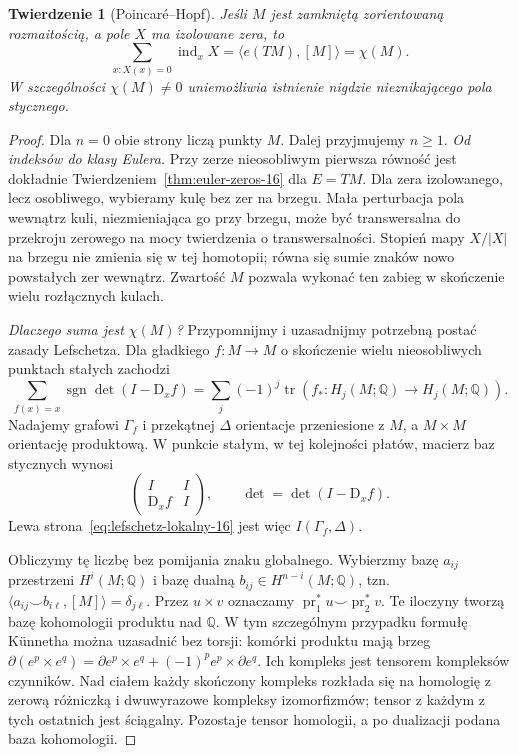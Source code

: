 \documentclass[11pt,a4paper,oneside]{report}
\newcommand{\Q}{\mathbb{Q}}
\newcommand{\pr}{\operatorname{pr}}
\newcommand{\D}{\mathrm D}
\theoremstyle{plain}
\newtheorem{twierdzenie}{Twierdzenie}[section]
\theoremstyle{definition}
\theoremstyle{remark}
\begin{document}
\begin{twierdzenie}[Poincaré--Hopf]
\label{thm:poincare-hopf-16}
Jeśli $M$ jest
zamkniętą
zorientowaną rozmaitością,
a pole $X$ ma
izolowane zera, to
\begin{equation}\label{eq:poincare-hopf-16}
 \sum_{x:X(x)=0}
     \operatorname{ind}_x X
 =\langle e(TM),[M]\rangle
 =\chi(M).
\end{equation}
W szczególności
$\chi(M)\ne0$
uniemożliwia istnienie
nigdzie nieznikającego
pola stycznego.
\end{twierdzenie}
\begin{proof}
Dla $n=0$ obie strony liczą punkty $M$.
Dalej przyjmujemy $n\geq1$.
\emph{Od indeksów do klasy Eulera.}
Przy zerze nieosobliwym
pierwsza równość jest
dokładnie
Twierdzeniem~\ref{thm:euler-zeros-16}
dla $E=TM$. Dla zera
izolowanego, lecz
osobliwego, wybieramy
kulę bez zer na
brzegu. Mała perturbacja
pola wewnątrz kuli,
niezmieniająca go
przy brzegu, może być
transwersalna do
przekroju zerowego
na mocy twierdzenia o transwersalności.
Stopień mapy
$X/|X|$ na brzegu
nie zmienia się
w tej homotopii;
równa się sumie
znaków nowo
powstałych zer
wewnątrz. Zwartość
$M$ pozwala wykonać
ten zabieg w
skończenie wielu
rozłącznych kulach.

\emph{Dlaczego suma jest $\chi(M)$?}
Przypomnijmy i uzasadnijmy
potrzebną postać
zasady Lefschetza.
Dla gładkiego
$f:M\to M$ o
skończenie wielu
nieosobliwych
punktach stałych
zachodzi
\begin{equation}\label{eq:lefschetz-lokalny-16}
 \sum_{f(x)=x}
    \operatorname{sgn}\det(I-\D_xf)
 =\sum_j(-1)^j
    \operatorname{tr}
      (f_*:H_j(M;\Q)\to H_j(M;\Q)).
\end{equation}
Nadajemy grafowi $\Gamma_f$ i przekątnej $\Delta$
orientacje przeniesione z $M$, a $M\times M$ orientację
produktową. W punkcie stałym, w tej kolejności płatów,
macierz baz stycznych wynosi
\[
 \begin{pmatrix}I&I\\\D_xf&I\end{pmatrix},
 \qquad \det=\det(I-\D_xf).
\]
Lewa strona~\eqref{eq:lefschetz-lokalny-16}
jest więc $I(\Gamma_f,\Delta)$.

Obliczymy tę liczbę bez pomijania znaku globalnego.
Wybierzmy bazę $a_{ij}$ przestrzeni $H^i(M;\Q)$
i bazę dualną $b_{ij}\in H^{n-i}(M;\Q)$, tzn.
$\langle a_{ij}\smile b_{i\ell},[M]\rangle=\delta_{j\ell}$.
Przez $u\times v$ oznaczamy
$\pr_1^*u\smile\pr_2^*v$. Te iloczyny tworzą bazę
kohomologii produktu nad $\Q$. W tym szczególnym
przypadku formułę Künnetha można uzasadnić bez torsji:
komórki produktu mają brzeg
$\partial(e^p\times e^q)=\partial e^p\times e^q+
(-1)^p e^p\times\partial e^q$.
Ich kompleks jest tensorem kompleksów czynników.
Nad ciałem każdy skończony kompleks rozkłada się na
homologię z zerową różniczką i dwuwyrazowe kompleksy
izomorfizmów; tensor z każdym z tych ostatnich
jest ściągalny. Pozostaje tensor homologii,
a po dualizacji podana baza kohomologii.


\end{proof}
\end{document}
